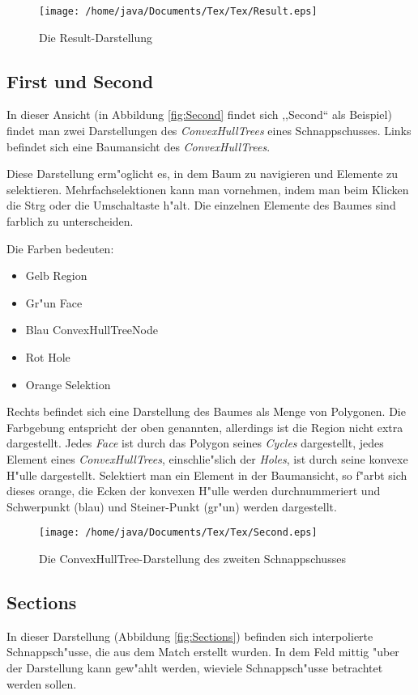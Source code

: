 \begin{figure}
   \centering
   \texttt{[image: /home/java/Documents/Tex/Tex/Result.eps]}
   \caption{Die Result-Darstellung}
   \label{fig:Result}
\end{figure}
\subsection{First und Second}
In dieser Ansicht (in Abbildung \vref{fig:Second} findet sich ,,Second`` als Beispiel) findet man zwei Darstellungen des \textit{ConvexHullTrees} eines Schnappschusses. Links befindet sich eine Baum\-ansicht des \textit{ConvexHullTrees}.

Diese Darstellung erm"oglicht es, in dem Baum zu navigieren und Elemente zu selektieren. Mehrfachselektionen kann man vornehmen, indem man beim Klicken die Strg oder die Umschaltaste h"alt. Die einzelnen Elemente des Baumes sind farblich zu unterscheiden.

Die Farben bedeuten:
\begin{itemize}
\item Gelb Region
\item Gr"un Face
\item Blau ConvexHullTreeNode
\item Rot Hole
\item Orange Selektion
\end{itemize} 

Rechts befindet sich eine Darstellung des Baumes als Menge von Polygonen. Die Farbgebung entspricht der oben genannten, allerdings ist die Region nicht extra dargestellt. Jedes \textit{Face} ist durch das Polygon seines \textit{Cycles} dargestellt, jedes Element eines \textit{ConvexHullTrees}, einschlie"slich der \textit{Holes}, ist durch seine konvexe H"ulle dargestellt. Selektiert man ein Element in der Baumansicht, so f"arbt sich dieses orange, die Ecken der konvexen H"ulle werden durchnummeriert und Schwerpunkt (blau) und Steiner-Punkt (gr"un) werden dargestellt.

\begin{figure}
   \centering
   \texttt{[image: /home/java/Documents/Tex/Tex/Second.eps]}
   \caption{Die ConvexHullTree-Darstellung des zweiten Schnappschusses}
   \label{fig:Second}
\end{figure}
\subsection{Sections}
In dieser Darstellung (Abbildung \vref{fig:Sections}) befinden  sich interpolierte Schnappsch"usse, die aus dem Match erstellt wurden. In dem Feld mittig "uber der Darstellung kann gew"ahlt werden, wieviele Schnappsch"usse betrachtet werden sollen.

